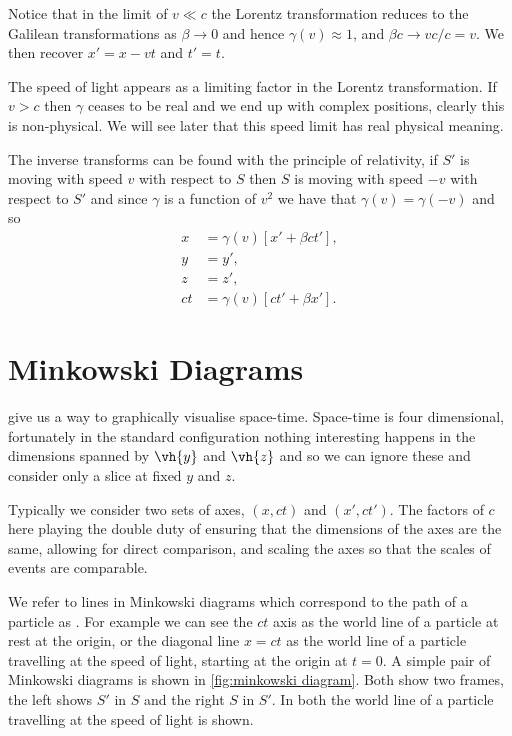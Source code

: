 \documentclass[fleqn]{NotesClass}
\begin{document}
    Notice that in the limit of \(v \ll c\) the Lorentz transformation reduces to the Galilean transformations as \(\beta \to 0\) and hence \(\gamma(v) \approx 1\), and \(\beta c \to vc/c = v\).
    We then recover \(x' = x - vt\) and \(t' = t\).
    
    The speed of light appears as a limiting factor in the Lorentz transformation.
    If \(v > c\) then \(\gamma\) ceases to be real and we end up with complex positions, clearly this is non-physical.
    We will see later that this speed limit has real physical meaning.
    
    The inverse transforms can be found with the principle of relativity, if \(S'\) is moving with speed \(v\) with respect to \(S\) then \(S\) is moving with speed \(-v\) with respect to \(S'\) and since \(\gamma\) is a function of \(v^2\) we have that \(\gamma(v) = \gamma(-v)\) and so
    \begin{align}
        x &= \gamma(v)[x' + \beta ct'],\\
        y &= y',\\
        z &= z',\\
        ct &= \gamma(v)[ct' + \beta x'].
    \end{align}
    
    \section{Minkowski Diagrams}
     give us a way to graphically visualise space-time.
    Space-time is four dimensional, fortunately in the standard configuration nothing interesting happens in the dimensions spanned by \(\vh{y}\) and \(\vh{z}\) and so we can ignore these and consider only a slice at fixed \(y\) and \(z\).
    
    Typically we consider two sets of axes, \((x, ct)\) and \((x', ct')\).
    The factors of \(c\) here playing the double duty of ensuring that the dimensions of the axes are the same, allowing for direct comparison, and scaling the axes so that the scales of events are comparable.
    
    We refer to lines in Minkowski diagrams which correspond to the path of a particle as .
    For example we can see the \(ct\) axis as the world line of a particle at rest at the origin, or the diagonal line \(x = ct\) as the world line of a particle travelling at the speed of light, starting at the origin at \(t = 0\).
    A simple pair of Minkowski diagrams is shown in \cref{fig:minkowski diagram}.
    Both show two frames, the left shows \(S'\) in \(S\) and the right \(S\) in \(S'\).
    In both the world line of a particle travelling at the speed of light is shown.
    
\end{document}
